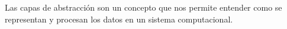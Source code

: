 \documentclass[preview]{standalone}
\begin{document}
\begin{center}
Las capas de abstracción son un
                        concepto que nos permite entender como
                       se representan y procesan los datos en
                       un sistema computacional.
\end{center}
\end{document}
